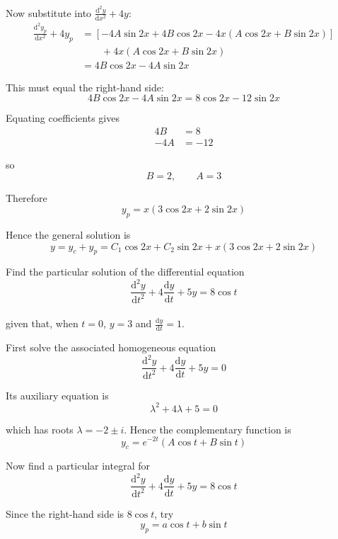 \documentclass[leqno]{article}
\begin{document}
\begin{enumerate}[
  label=\textbf{\arabic*.},
  leftmargin=*,
  topsep=0pt,
  partopsep=0pt,
  parsep=0pt
]
\begin{djsSolution}
\begin{enumerate}[label=\textbf{(\alph*)}]
  Now substitute into $\frac{\mathrm{d}^2 y}{\mathrm{d}x^2}+4y$:
  \begin{align*}
  \frac{\mathrm{d}^2 y_p}{\mathrm{d}x^2}+4y_p
  &= \left[-4A\sin 2x+4B\cos 2x-4x(A\cos 2x+B\sin 2x)\right] \\
  &\qquad {} + 4x(A\cos 2x+B\sin 2x) \\
  &= 4B\cos 2x-4A\sin 2x
  \end{align*}

  This must equal the right-hand side:
  \[
  4B\cos 2x-4A\sin 2x=8\cos 2x-12\sin 2x
  \]

  Equating coefficients gives
  \begin{align*}
  4B &= 8 \\
  -4A &= -12
  \end{align*}

  so
  \[
  B=2,\qquad A=3
  \]

  Therefore
  \[
  y_p=x(3\cos 2x+2\sin 2x)
  \]

  Hence the general solution is
  \[
  y=y_c+y_p=C_1\cos 2x+C_2\sin 2x+x(3\cos 2x+2\sin 2x)
  \]
\end{enumerate}
\end{djsSolution}


\newpage

\questionitem

Find the particular solution of the differential equation\\
\[
\frac{\mathrm{d}^2 y}{\mathrm{d}t^2}+4\frac{\mathrm{d}y}{\mathrm{d}t}+5y=8\cos t
\]\\
given that, when $t=0$, $y=3$ and $\frac{\mathrm{d}y}{\mathrm{d}t}=1$.  \\

\vspace*{10pt}

\begin{djsSolution}
First solve the associated homogeneous equation
\[
\frac{\mathrm{d}^2y}{\mathrm{d}t^2}+4\frac{\mathrm{d}y}{\mathrm{d}t}+5y=0
\]

Its auxiliary equation is
\[
\lambda^2+4\lambda+5=0
\]

which has roots \(\lambda=-2\pm i\). Hence the complementary function is
\[
y_c=e^{-2t}(A\cos t+B\sin t)
\]

Now find a particular integral for
\[
\frac{\mathrm{d}^2y}{\mathrm{d}t^2}+4\frac{\mathrm{d}y}{\mathrm{d}t}+5y=8\cos t
\]

Since the right-hand side is \(8\cos t\), try
\[
y_p=a\cos t+b\sin t
\]


\end{djsSolution}
\end{enumerate}
\end{document}
